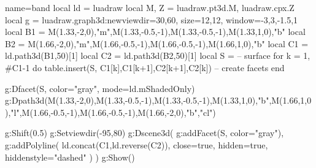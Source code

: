 \documentclass{standalone}
\begin{document}
\begin{luadraw}{name=band}
local ld = luadraw
local M, Z = luadraw.pt3d.M, luadraw.cpx.Z
local g = luadraw.graph3d:new{viewdir={30,60}, size={12,12}, window={-3,3,-1.5,1}}
local B1 = {M(1.33,-2,0),"m",M(1.33,-0.5,-1),M(1.33,-0.5,-1),M(1.33,1,0),"b"}
local B2 = {M(1.66,-2,0),"m",M(1.66,-0.5,-1),M(1.66,-0.5,-1),M(1.66,1,0),"b"}
local C1 = ld.path3d(B1,50)[1]
local C2 = ld.path3d(B2,50)[1]
local S = {} -- surface
for k = 1, #C1-1 do
    table.insert(S, {C1[k],C1[k+1],C2[k+1],C2[k]}) -- create facets
end

g:Dfacet(S, {color="gray", mode=ld.mShadedOnly})
g:Dpath3d({M(1.33,-2,0),M(1.33,-0.5,-1),M(1.33,-0.5,-1),M(1.33,1,0),"b",M(1.66,1,0),"l",M(1.66,-0.5,-1),M(1.66,-0.5,-1),M(1.66,-2,0),"b","cl"})

g:Shift(0.5)
g:Setviewdir(-95,80)
g:Dscene3d( 
    g:addFacet(S, {color="gray"}), 
    g:addPolyline( ld.concat(C1,ld.reverse(C2)), 
        {close=true, hidden=true, hiddenstyle="dashed"} )
    )
g:Show()
\end{luadraw}
\end{document}
